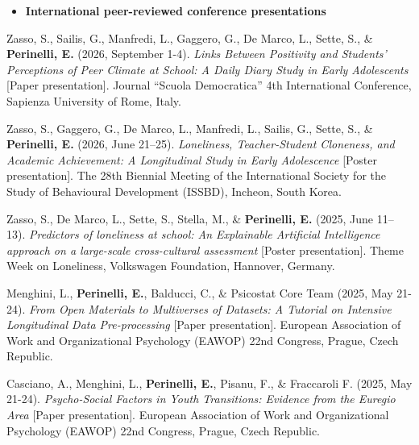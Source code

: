 \documentclass[hidelinks, letterpaper,10pt]{article} %
\begin{document}
\begin{itemize} 
	\setlength{\topsep}{0pt}%
	\setlength{\leftmargin}{0.1in}%
	\setlength{\listparindent}{-0.1in}%
	\setlength{\itemindent}{-0.2in}%
	\setlength{\parsep}{\parskip}%
	
	\item {\textbf{\large{International peer-reviewed conference presentations}}}
\end{itemize}
\begin{etaremune}

	\item Zasso, S., Sailis, G., Manfredi, L., Gaggero, G., De Marco, L., Sette, S., \& \textbf{Perinelli, E.} (2026, September 1-4). \textit{Links Between Positivity and Students’ Perceptions of Peer Climate at School: A Daily Diary Study in Early Adolescents} [Paper presentation]. Journal ``Scuola Democratica'' 4th International Conference, Sapienza University of Rome, Italy.	
	
	\item Zasso, S., Gaggero, G., De Marco, L., Manfredi, L., Sailis, G., Sette, S., \& \textbf{Perinelli, E.} (2026, June 21–25). \textit{Loneliness, Teacher-Student Cloneness, and Academic Achievement: A Longitudinal Study in Early Adolescence} [Poster presentation]. The 28th Biennial Meeting of the International Society for the Study of Behavioural Development (ISSBD), Incheon, South Korea.	
	
	\item Zasso, S., De Marco, L., Sette, S., Stella, M., \& \textbf{Perinelli, E.} (2025, June 11–13). \textit{Predictors of loneliness at school: An Explainable Artificial Intelligence approach on a large-scale cross-cultural assessment} [Poster presentation]. Theme Week on Loneliness, Volkswagen Foundation, Hannover, Germany.

	\item Menghini, L., \textbf{Perinelli, E.}, Balducci, C., \& Psicostat Core Team (2025, May 21-24). \textit{From Open Materials to Multiverses of Datasets: A Tutorial on Intensive Longitudinal Data Pre-processing} [Paper presentation]. European Association of Work and Organizational Psychology (EAWOP) 22nd Congress, Prague, Czech Republic.

	\item Casciano, A., Menghini, L., \textbf{Perinelli, E.}, Pisanu, F., \& Fraccaroli F. (2025, May 21-24). \textit{Psycho-Social Factors in Youth Transitions: Evidence from the Euregio Area} [Paper presentation]. European Association of Work and Organizational Psychology (EAWOP) 22nd Congress, Prague, Czech Republic.


\end{etaremune}
\end{document}
